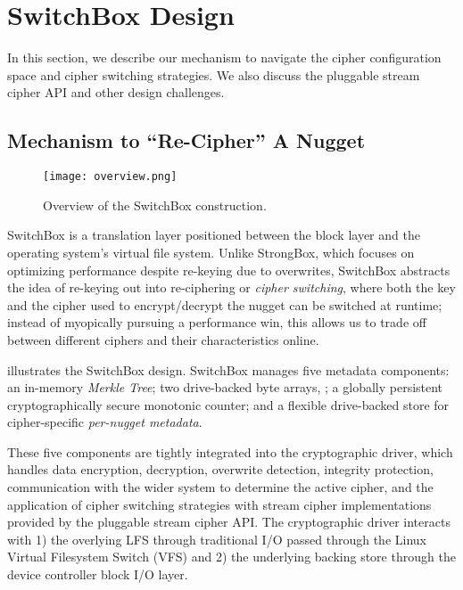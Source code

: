 \section{SwitchBox Design}\label{sec:design}


In this section, we describe our mechanism to navigate the cipher
configuration space and cipher switching strategies. We also discuss the
pluggable stream cipher API and other design challenges.

\subsection{Mechanism to ``Re-Cipher'' A Nugget}

\begin{figure}[t]
   \centering
   \texttt{[image: overview.png]}
   \caption{Overview of the SwitchBox construction.}\label{fig:overview}
\end{figure}

SwitchBox is a translation layer positioned between the block layer and the
operating system's virtual file system. Unlike StrongBox, which
focuses on optimizing performance despite re-keying due to overwrites, SwitchBox
abstracts the idea of re-keying out into re-ciphering or \emph{cipher
switching}, where both the key and the cipher used to encrypt/decrypt the nugget
can be switched at runtime; instead of myopically pursuing a performance win,
this allows us to trade off between different ciphers and their characteristics
online.

 illustrates the SwitchBox design. SwitchBox manages five
metadata components: an in-memory \emph{Merkle Tree}; two drive-backed byte
arrays, ; a
globally persistent cryptographically secure monotonic counter; and a flexible
drive-backed store for cipher-specific \emph{per-nugget metadata}.

These five components are tightly integrated into the cryptographic driver,
which handles data encryption, decryption, overwrite detection, integrity
protection, communication with the wider system to determine the active cipher,
and the application of cipher switching strategies with stream cipher
implementations provided by the pluggable stream cipher API. The cryptographic
driver interacts with 1) the overlying LFS through traditional I/O passed
through the Linux Virtual Filesystem Switch (VFS) and 2) the underlying
backing store through the device controller block I/O layer.

